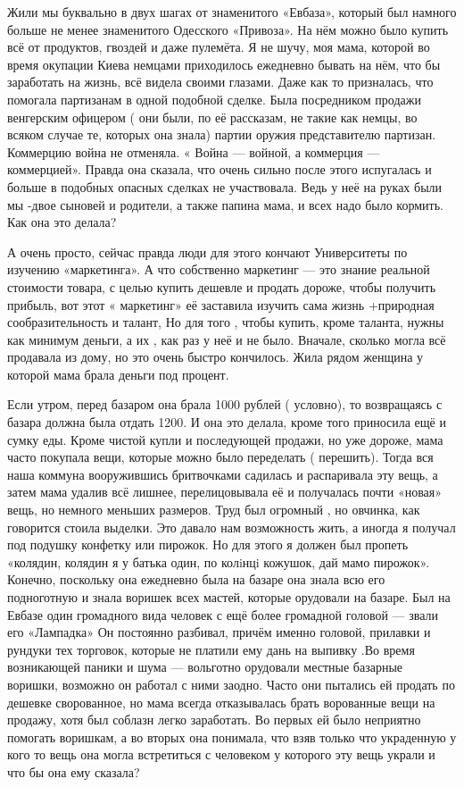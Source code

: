 Жили мы буквально в двух шагах от знаменитого «Евбаза», который был намного
больше не менее знаменитого Одесского «Привоза». На нём можно было купить всё
от продуктов, гвоздей и даже пулемёта. Я не шучу, моя мама, которой  во время
окупации Киева немцами приходилось ежедневно бывать на нём, что бы заработать
на жизнь, всё видела  своими глазами. Даже как то призналась, что помогала
партизанам  в одной подобной сделке. Была посредником продажи  венгерским
офицером ( они были, по её рассказам, не такие как немцы, во всяком случае те,
которых она знала)  партии оружия представителю партизан. Коммерцию война не
отменяла. « Война — войной, а коммерция — коммерцией». Правда она сказала, что
очень сильно после этого испугалась и больше в подобных опасных сделках не
участвовала. Ведь у неё на руках были мы -двое сыновей и родители, а также
папина мама, и всех  надо было кормить.    Как она это делала?

А очень просто, сейчас правда люди для этого кончают Университеты по изучению
«маркетинга». А что собственно маркетинг — это знание реальной стоимости
товара, с целью купить дешевле и продать дороже, чтобы получить прибыль, вот
этот « маркетинг» её заставила изучить сама  жизнь +природная сообразительность
и талант, Но для того , чтобы купить, кроме таланта, нужны как минимум деньги,
а их , как раз у неё и не было. Вначале, сколько могла всё продавала из дому,
но это очень быстро кончилось.  Жила рядом женщина у которой мама  брала деньги
под процент. 

Если утром, перед базаром она брала 1000 рублей ( условно), то
возвращаясь с базара должна была отдать 1200. И она это делала, кроме того
приносила ещё и сумку еды. Кроме чистой купли и последующей продажи, но уже
дороже, мама часто покупала вещи, которые можно было переделать ( перешить).
Тогда вся наша коммуна вооружившись бритвочками  садилась и распаривала эту
вещь, а затем мама удалив  всё лишнее, перелицовывала её и получалась почти
«новая» вещь, но немного меньших размеров. Труд был огромный , но овчинка, как
говорится стоила выделки. Это давало нам возможность жить, а иногда я получал
под подушку конфетку или пирожок. Но для этого я должен был пропеть «колядин,
колядин я  у батька один, по колiнцi кожушок, дай мамо пирожок». Конечно,
поскольку она ежедневно была на базаре она знала всю его подноготную и знала
воришек всех мастей, которые орудовали на базаре. Был на Евбазе один громадного
вида человек  с  ещё более громадной головой — звали его  «Лампадка» Он
постоянно разбивал, причём именно головой, прилавки и рундуки тех торговок,
которые не платили ему дань на выпивку .Во время возникающей паники и шума —
вольготно  орудовали местные базарные воришки, возможно он работал с ними
заодно. Часто они пытались ей продать по дешевке сворованное, но мама всегда
отказывалась брать ворованные вещи на продажу, хотя был соблазн легко
заработать. Во первых ей было неприятно помогать воришкам, а во вторых она
понимала, что взяв только что украденную у кого то вещь  она  могла
встретиться  с человеком у которого эту вещь украли и что бы она ему сказала?

